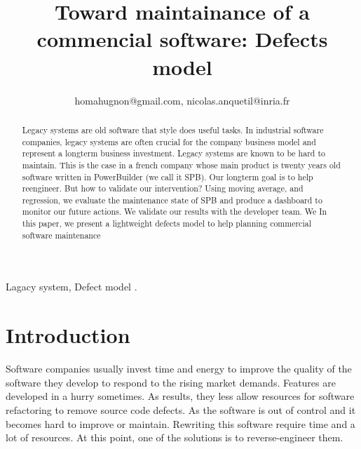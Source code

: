 \documentclass[10pt,conference]{IEEEtran}
\begin{document}
\title{Toward  maintainance of  a commencial software: Defects model }

\author{
homahugnon@gmail.com, nicolas.anquetil@inria.fr}


\maketitle

\begin{abstract}
Legacy systems are old software that style does useful tasks. In industrial software companies, legacy systems are often crucial for the company business model and represent a longterm business investment. Legacy systems are known to be hard to maintain. This is the case in a french company whose main product is twenty years old software written in PowerBuilder (we call it SPB).  Our longterm goal is to help reengineer. But how to validate our intervention? Using moving average, and regression, we evaluate the maintenance state of SPB and produce a dashboard to monitor our future actions. We validate our results with the developer team. We  In this paper, we present a lightweight defects model to help planning commercial software maintenance
\end{abstract}

\begin{IEEEkeywords}
Lagacy system, Defect model .
\end{IEEEkeywords}

\section{Introduction}
Software companies usually invest time and energy to improve the quality of the software they develop to respond to the rising market demands. Features are developed in a hurry sometimes.  As results, they less allow resources for software refactoring to remove source code defects.   As the software is out of control and it becomes hard to improve or maintain. Rewriting this software require time and a lot of resources. At this point, one of the solutions is to reverse-engineer them.  
\end{document}

